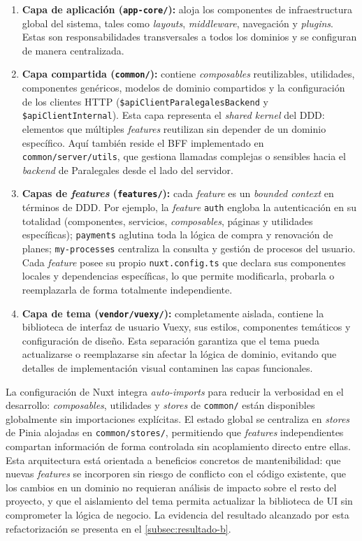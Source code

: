 \begin{enumerate}
  \item \textbf{Capa de aplicación (\texttt{app-core/}):} aloja los componentes de infraestructura global del sistema, tales como \textit{layouts}, \textit{middleware}, navegación y \textit{plugins}. Estas son responsabilidades transversales a todos los dominios y se configuran de manera centralizada.

  \item \textbf{Capa compartida (\texttt{common/}):} contiene \textit{composables} reutilizables, utilidades, componentes genéricos, modelos de dominio compartidos y la configuración de los clientes HTTP (\texttt{\$apiClientParalegalesBackend} y \texttt{\$apiClientInternal}). Esta capa representa el \textit{shared kernel} del DDD: elementos que múltiples \textit{features} reutilizan sin depender de un dominio específico. Aquí también reside el BFF implementado en \texttt{common/server/utils}, que gestiona llamadas complejas o sensibles hacia el \textit{backend} de Paralegales desde el lado del servidor.

  \item \textbf{Capas de \textit{features} (\texttt{features/}):} cada \textit{feature} es un \textit{bounded context} en términos de DDD. Por ejemplo, la \textit{feature} \texttt{auth} engloba la autenticación en su totalidad (componentes, servicios, \textit{composables}, páginas y utilidades específicas); \texttt{payments} aglutina toda la lógica de compra y renovación de planes; \texttt{my-processes} centraliza la consulta y gestión de procesos del usuario. Cada \textit{feature} posee su propio \texttt{nuxt.config.ts} que declara sus componentes locales y dependencias específicas, lo que permite modificarla, probarla o reemplazarla de forma totalmente independiente.

  \item \textbf{Capa de tema (\texttt{vendor/vuexy/}):} completamente aislada, contiene la biblioteca de interfaz de usuario Vuexy, sus estilos, componentes temáticos y configuración de diseño. Esta separación garantiza que el tema pueda actualizarse o reemplazarse sin afectar la lógica de dominio, evitando que detalles de implementación visual contaminen las capas funcionales.
\end{enumerate}

La configuración de Nuxt integra \textit{auto-imports} para reducir la verbosidad en el desarrollo: \textit{composables}, utilidades y \textit{stores} de \texttt{common/} están disponibles globalmente sin importaciones explícitas. El estado global se centraliza en \textit{stores} de Pinia alojadas en \texttt{common/stores/}, permitiendo que \textit{features} independientes compartan información de forma controlada sin acoplamiento directo entre ellas. Esta arquitectura está orientada a beneficios concretos de mantenibilidad: que nuevas \textit{features} se incorporen sin riesgo de conflicto con el código existente, que los cambios en un dominio no requieran análisis de impacto sobre el resto del proyecto, y que el aislamiento del tema permita actualizar la biblioteca de UI sin comprometer la lógica de negocio. La evidencia del resultado alcanzado por esta refactorización se presenta en el \autoref{subsec:resultado-b}.

